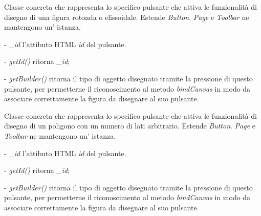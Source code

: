 Classe concreta che rappresenta lo specifico pulsante che attiva le funzionalit\` a di disegno di una figura rotonda o elissoidale.
Estende \textit{Button}.
\textit{Page} e \textit{Toolbar} ne mantengono un' istanza.
\begin{elencopuntato}[\subsubsecindent]
\item[-] \textit{{\_}id} l'attibuto HTML \textit{id} del pulsante.
\end{elencopuntato}
\begin{elencopuntato}[\subsubsecindent]
\item[-] \textit{getId()} ritorna \textit{{\_}id};
\item[-] \textit{getBuilder()} ritorna il tipo di oggetto disegnato tramite la pressione di questo pulsante, per permetterne il riconoscimento al metodo \textit{bindCanvas} in modo da associare correttamente la figura da disegnare al suo pulsante.
\end{elencopuntato}

Classe concreta che rappresenta lo specifico pulsante che attiva le funzionalit\` a di disegno di un poligono con un numero di lati arbitrario.
Estende \textit{Button}.
\textit{Page} e \textit{Toolbar} ne mantengono un' istanza.
\begin{elencopuntato}[\subsubsecindent]
\item[-] \textit{{\_}id} l'attibuto HTML \textit{id} del pulsante.
\end{elencopuntato}
\begin{elencopuntato}[\subsubsecindent]
\item[-] \textit{getId()} ritorna \textit{{\_}id};
\item[-] \textit{getBuilder()} ritorna il tipo di oggetto disegnato tramite la pressione di questo pulsante, per permetterne il riconoscimento al metodo \textit{bindCanvas} in modo da associare correttamente la figura da disegnare al suo pulsante.
\end{elencopuntato}


